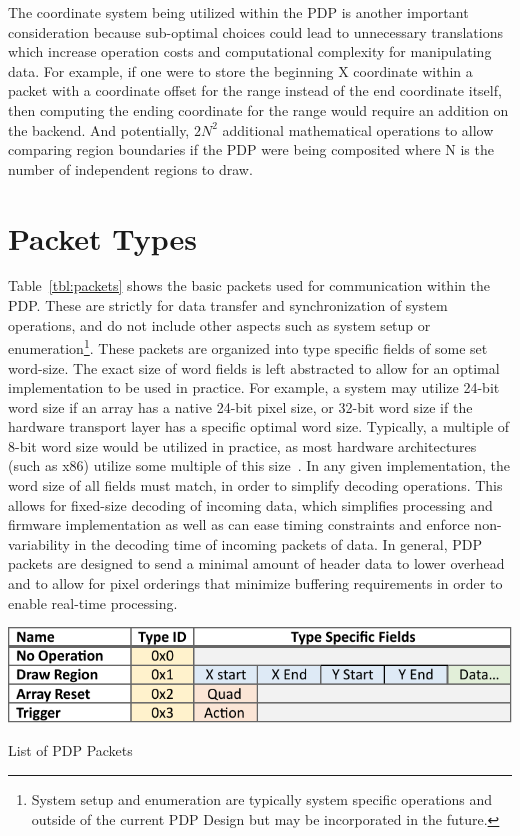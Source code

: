     The coordinate system being utilized within the PDP is another important consideration because sub-optimal choices could lead to unnecessary translations which increase operation costs and computational complexity for manipulating data. For example, if one were to store the beginning X coordinate within a packet with a coordinate offset for the range instead of the end coordinate itself, then computing the ending coordinate for the range would require an addition on the backend. And potentially, $2N^2$ additional mathematical operations to allow comparing region boundaries if the PDP were being composited where N is the number of independent regions to draw.

\section{Packet Types}
    \label{sec:packet_types}
    Table~\ref{tbl:packets} shows the basic packets used for communication within the PDP. These are strictly for data transfer and synchronization of system operations, and do not include other aspects such as system setup or enumeration\footnote{System setup and enumeration are typically system specific operations and outside of the current PDP Design but may be incorporated in the future.}. These packets are organized into type specific fields of some set word-size. The exact size of word fields is left abstracted to allow for an optimal implementation to be used in practice. For example, a system may utilize 24-bit word size if an array has a native 24-bit pixel size, or 32-bit word size if the hardware transport layer has a specific optimal word size. Typically, a multiple of 8-bit word size would be utilized in practice, as most hardware architectures (such as x86) utilize some multiple of this size~\cite{HennessyEtAl2012}. In any given implementation, the word size of all fields must match, in order to simplify decoding operations. This allows for fixed-size decoding of incoming data, which simplifies processing and firmware implementation as well as can ease timing constraints and enforce non-variability in the decoding time of incoming packets of data. In general, PDP packets are designed to send a minimal amount of header data to lower overhead and to allow for pixel orderings that minimize buffering requirements in order to enable real-time processing.

    \begin{table}
        \centering
        \includegraphics[width=1.0\textwidth]{fig/packet_chart.pdf}
        \caption{List of PDP Packets}
        \label{tbl:packets}
    \end{table}


